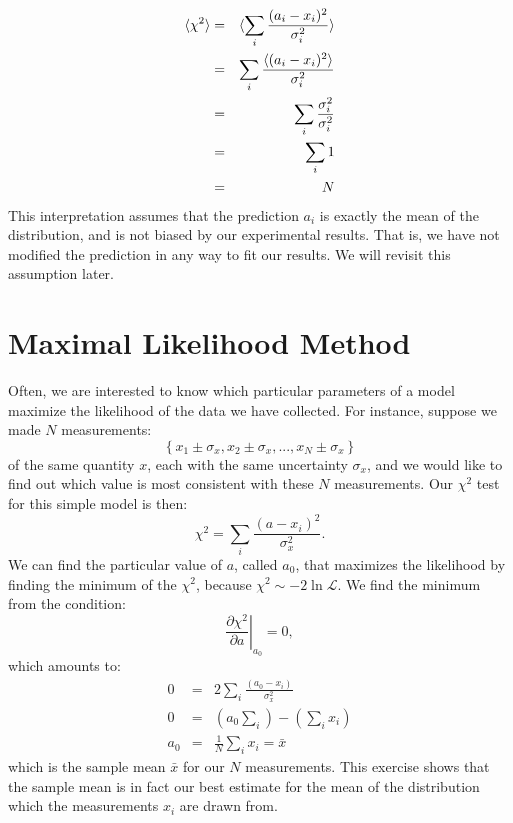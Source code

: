 \documentclass[12pt,oneside]{book}
\begin{document}
\begin{eqnarray*}
  \braket{\chi^2} &=& \braket{\sum_i \frac{(a_i-x_i)^2}{\sigma_i^2}} \\
&=& \sum_i \frac{\braket{(a_i-x_i)^2}}{\sigma_i^2} \\
&=& \sum_i \frac{\sigma_i^2}{\sigma_i^2} \\
&=& \sum_i 1 \\
&=& N \\
\end{eqnarray*}
This interpretation assumes that the prediction $a_i$ is exactly the
mean of the distribution, and is not biased by our experimental
results.  That is, we have not modified the prediction in any way to
fit our results.  We will revisit this assumption later.

\section{Maximal Likelihood Method}
Often, we are interested to know which particular parameters of a model maximize the likelihood
of the data we have collected.  For instance, suppose we made $N$ measurements:
\begin{displaymath}
\left\{ x_1 \pm \sigma_x, x_2 \pm \sigma_x, ..., x_N \pm \sigma_x \right\}
\end{displaymath}
of the same quantity $x$, each with the same uncertainty $\sigma_x$, and we
would like to find out which value is most consistent with
these $N$ measurements.  Our $\chi^2$ test for this simple model is
then:
\begin{displaymath}
\chi^2 = \sum_i \frac{(a - x_i)^2}{\sigma_x^2}.
\end{displaymath}
We can find the particular value of $a$, called $a_0$, that maximizes
the likelihood by finding the minimum of the $\chi^2$, because $\chi^2
\sim - 2 \ln \mathcal{L}$.  We find the minimum from the condition:
\begin{displaymath}
\left.\frac{\partial\chi^2}{\partial a}\right|_{a_0} = 0,
\end{displaymath}
which amounts to:
\begin{eqnarray}
0 &=& 2 \sum_i \frac{(a_0 - x_i)}{\sigma_x^2} \nonumber \\
0 &=& \left( a_0 \sum_i \right)- \left( \sum_i x_i \right) \nonumber \\
a_0 &=& \frac{1}{N} \sum_i x_i \label{eqn:mean} = \bar{x}
\end{eqnarray}
which is the sample mean $\bar{x}$ for our $N$ measurements.  This
exercise shows that the sample mean is in fact our best estimate for
the mean of the distribution which the measurements $x_i$ are drawn from.
\end{document}
